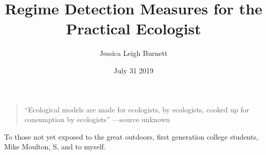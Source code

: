 \documentclass[12pt,twoside,openany]{reedthesis}
\title{Regime Detection Measures for the Practical Ecologist}
\author{Jessica Leigh Burnett}
\date{July 31 2019}
\begin{document}
  \maketitle

\frontmatter %
\pagestyle{empty} %
  \begin{preface}
    \begin{quote}
    ``Ecological models are made for ecologists, by ecologists, cooked up for consumption by ecologists'' ---source unknown
    \end{quote}
  \end{preface}
 \begin{dedication}
   To those not yet exposed to the great outdoors, first generation college students, Mike Moulton, S, and to myself.
 \end{dedication}
\end{document}
